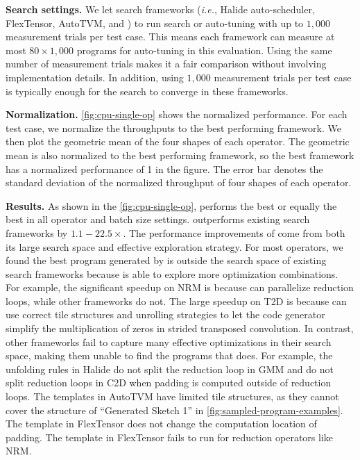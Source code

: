 \textbf{Search settings.}
We let search frameworks (\textit{i.e.}, Halide auto-scheduler, FlexTensor, AutoTVM, and \Ansor) to run search or auto-tuning with up to $1,000$ measurement trials per test case.
This means each framework can measure at most $80 \times 1,000$ programs for auto-tuning in this evaluation.
Using the same number of measurement trials makes it a fair comparison without involving implementation details.
In addition, using $1,000$ measurement trials per test case is typically enough for the search to converge in these frameworks.


\textbf{Normalization.}
\autoref{fig:cpu-single-op} shows the normalized performance.
For each test case, we normalize the throughputs to the best performing framework. We then plot the geometric mean of the four shapes of each operator. The geometric mean is also normalized to the best performing framework, so the best framework has a normalized performance of 1 in the figure. The error bar denotes the standard deviation of the normalized throughput of four shapes of each operator.

\textbf{Results.}
As shown in the \autoref{fig:cpu-single-op}, \Ansor performs the best or equally the best in all operator and batch size settings.
\Ansor outperforms existing search frameworks by  $1.1-22.5 \times$.
The performance improvements of \Ansor come from both its large search space and effective exploration strategy.
For most operators, we found the best program generated by \Ansor is outside the search space of existing search frameworks because \Ansor is able to explore more optimization combinations.
For example, the significant speedup on NRM is because \Ansor can parallelize reduction loops, while other frameworks do not.
The large speedup on T2D is because \Ansor can use correct tile structures and unrolling strategies to let the code generator simplify the multiplication of zeros in strided transposed convolution.
In contrast, other frameworks fail to capture many effective optimizations in their search space, making them unable to find the programs that \Ansor does.
For example, the unfolding rules in Halide do not split the reduction loop in GMM and do not split reduction loops in C2D when padding is computed outside of reduction loops.
The templates in AutoTVM have limited tile structures, as they cannot cover the structure of ``Generated Sketch 1'' in \autoref{fig:sampled-program-examples}.
The template in FlexTensor does not change the computation location of padding. The template in FlexTensor fails to run for reduction operators like NRM.

